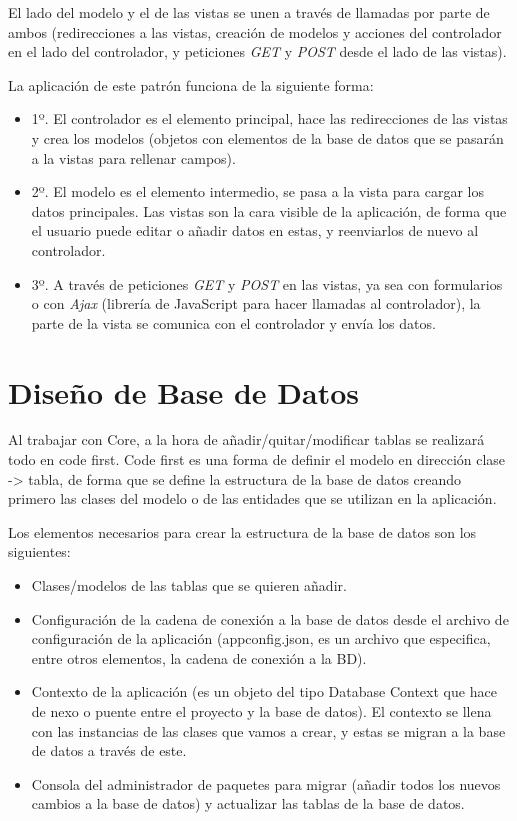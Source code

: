 El lado del modelo y el de las vistas se unen a través de llamadas por parte de ambos (redirecciones a las vistas, creación de modelos y acciones del controlador en el lado del controlador, y peticiones \emph{GET} y \emph{POST} desde el lado de las vistas).

La aplicación de este patrón funciona de la siguiente forma:
\begin{itemize}
    \item 1º. El controlador es el elemento principal, hace las redirecciones de las vistas y crea los modelos (objetos con elementos de la base de datos que se pasarán a la vistas para rellenar campos).
    \item 2º. El modelo es el elemento intermedio, se pasa a la vista para cargar los datos principales. Las vistas son la cara visible de la aplicación, de forma que el usuario puede editar o añadir datos en estas, y reenviarlos de nuevo al controlador.
    \item 3º. A través de peticiones \emph{GET} y \emph{POST} en las vistas, ya sea con formularios o con \emph{Ajax} (librería de JavaScript para hacer llamadas al controlador), la parte de la vista se comunica con el controlador y envía los datos.
\end{itemize}

\section{Diseño de Base de Datos}
Al trabajar con Core, a la hora de añadir/quitar/modificar tablas se realizará todo en code first. Code first es una forma de definir el modelo en dirección clase -> tabla, de forma que se define la estructura de la base de datos creando primero las clases del modelo o de las entidades que se utilizan en la aplicación. 

Los elementos necesarios para crear la estructura de la base de datos son los siguientes:
\begin{itemize}
    \item Clases/modelos de las tablas que se quieren añadir.
    \item Configuración de la cadena de conexión a la base de datos desde el archivo de configuración de la aplicación (appconfig.json, es un archivo que especifica, entre otros elementos, la cadena de conexión a la BD).
    \item Contexto de la aplicación (es un objeto del tipo Database Context que hace de nexo o puente entre el proyecto y la base de datos). El contexto se llena con las instancias de las clases que vamos a crear, y estas se migran a la base de datos a través de este.
    \item Consola del administrador de paquetes para migrar (añadir todos los nuevos cambios a la base de datos) y actualizar las tablas de la base de datos.
\end{itemize}

